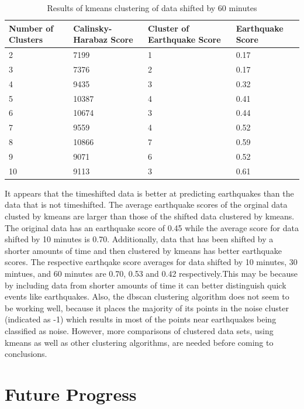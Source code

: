 \documentclass[colorlinks=true,pdfstartview=FitV,linkcolor=blue,
            citecolor=red,urlcolor=magenta]{ligodoc}
\begin{document}
\begin{table}[h!]
\centering
 \begin{tabular}{| m{3.5cm} m{3.5cm} m{3.5cm} m{3.5cm}|} 
 \hline
 Number of Clusters & Calinsky-Harabaz Score & Cluster of Earthquake Score & Earthquake Score\\ [0.5ex] 
 \hline\hline
 2 & 7199 & 1 & 0.17\\ 
 \hline
 3 & 7376 & 2 & 0.17\\
 \hline
 4 & 9435 & 3 & 0.32\\
 \hline
 5 & 10387 & 4 & 0.41\\
 \hline
 6 & 10674 & 3 & 0.44\\ 
 \hline
 7 & 9559 & 4 & 0.52\\
 \hline
 8 & 10866 & 7 & 0.59\\
 \hline
 9 & 9071 & 6 & 0.52\\
 \hline
 10 & 9113 & 3 & 0.61\\
 \hline
 \end{tabular}
 \caption{Results of kmeans clustering of data shifted by 60 minutes}
 \label{Table 5}
\end{table}

\par It appears that the timeshifted data is better at predicting earthquakes than the data that is not timeshifted. The average earthquake scores of the orginal data clusted by kmeans  are larger than those of the shifted data clustered by kmeans. The original data has an earthquake score of 0.45 while the average score for data shifted by 10 minutes is 0.70. Additionally, data that has been shifted by a shorter amounts of time and then clustered by kmeans has better earthquake scores. The respective earthqake score averages for data shifted by 10 minutes, 30 mintues, and 60 minutes are 0.70, 0.53 and 0.42 respectively.This may be because by including data from shorter amounts of time it can better distinguish quick events like earthquakes. Also, the dbscan clustering algorithm does not seem to be working well, because it places the majority of its points in the noise cluster (indicated as -1)  which results in most of the points near earthquakes being classified as noise. However, more comparisons of clustered data sets, using kmeans as well as other clustering algorithms, are needed before coming to conclusions. 
 
\section{Future Progress}
\end{document}
